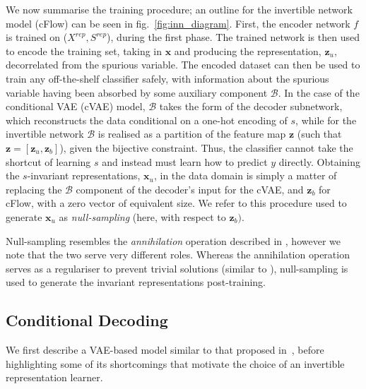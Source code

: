 We now summarise the training procedure; an outline for the invertible network model (cFlow) can be seen in fig.~\ref{fig:inn_diagram}.
First, the encoder network $f$ is trained on ($X^\mathit{rep}, S^\mathit{rep}$), during the first phase.
The trained network is then used to encode the training set,
taking in $\bm{x}$ and producing the representation, $\bm{z}_u$, decorrelated from the spurious variable.
The encoded dataset can then be used to train any off-the-shelf classifier safely, with information about the spurious variable having been absorbed by some auxiliary component $\mathcal{B}$.
In the case of the conditional VAE (cVAE) model,
$\mathcal{B}$ takes the form of the decoder subnetwork, which reconstructs the data conditional on a one-hot encoding of $s$,
while for the invertible network $\mathcal{B}$ is realised as a partition of the feature map $\bm{z}$
(such that $\bm{z} = [\bm{z}_u, \bm{z}_b]$), given the bijective constraint.
Thus, the classifier cannot take the shortcut of learning $s$ and instead must learn how to predict $y$ directly.
Obtaining the $s$-invariant representations, $\bm{x}_u$, in the data domain
is simply a matter of replacing the $\mathcal{B}$ component of the decoder's input for the cVAE,
and $\bm{z}_b$ for cFlow, with a zero vector of equivalent size.
We refer to this procedure used to generate $\bm{x}_u$ as \emph{null-sampling} (here, with respect to $\bm{z}_b)$.

Null-sampling resembles the \emph{annihilation} operation described in \citet{xiao2017dna}, however we note that the two serve very different roles.  Whereas the annihilation operation serves as a regulariser to prevent trivial solutions (similar to \cite{jaiswal2018unsupervised}), null-sampling is used to generate the invariant representations post-training.

\subsection{Conditional Decoding}%
\label{conddec}
\noindent We first describe a VAE-based model similar to that proposed in~\citet{madras2018learning}, before highlighting some of its shortcomings that motivate the choice of an invertible representation learner.

